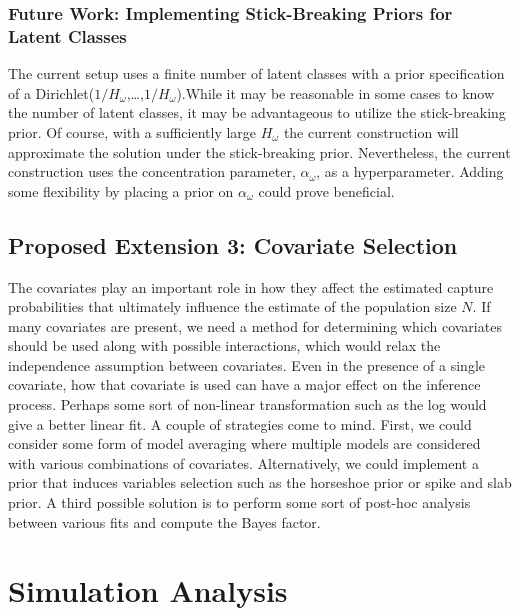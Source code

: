 \documentclass[
  12pt,
]{article}
\begin{document}
\subsubsection{Future Work: Implementing Stick-Breaking Priors for Latent Classes}

The current setup uses a finite number of latent classes with a prior
specification of a Dirichlet(\(1/H_\omega\),\ldots,\(1/H_\omega\)).While
it may be reasonable in some cases to know the number of latent classes,
it may be advantageous to utilize the stick-breaking prior. Of course,
with a sufficiently large \(H_\omega\) the current construction will
approximate the solution under the stick-breaking prior. Nevertheless,
the current construction uses the concentration parameter,
\(\alpha_\omega\), as a hyperparameter. Adding some flexibility by
placing a prior on \(\alpha_\omega\) could prove beneficial.

\subsection{Proposed Extension 3: Covariate Selection}
\label{Sec:variableselection}

The covariates play an important role in how they affect the estimated
capture probabilities that ultimately influence the estimate of the
population size \(N\). If many covariates are present, we need a method
for determining which covariates should be used along with possible
interactions, which would relax the independence assumption between
covariates. Even in the presence of a single covariate, how that
covariate is used can have a major effect on the inference process.
Perhaps some sort of non-linear transformation such as the log would
give a better linear fit. A couple of strategies come to mind. First, we
could consider some form of model averaging where multiple models are
considered with various combinations of covariates. Alternatively, we
could implement a prior that induces variables selection such as the
horseshoe prior or spike and slab prior. A third possible solution is to
perform some sort of post-hoc analysis between various fits and compute
the Bayes factor.

\newpage
\section{Simulation Analysis}
\label{sec:simulationanalysis}
\end{document}
